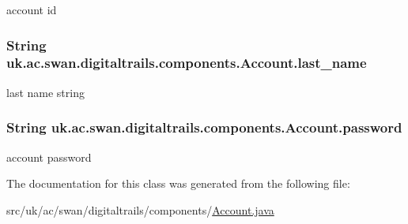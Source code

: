 account id 

\hypertarget{classuk_1_1ac_1_1swan_1_1digitaltrails_1_1components_1_1_account_a30eb77af35d518d869fb6cae590151e0}{
\subsubsection[{last\+\_\+name}]{\setlength{\rightskip}{0pt plus 5cm}String uk.\+ac.\+swan.\+digitaltrails.\+components.\+Account.\+last\+\_\+name}}\label{classuk_1_1ac_1_1swan_1_1digitaltrails_1_1components_1_1_account_a30eb77af35d518d869fb6cae590151e0}


last name string 

\hypertarget{classuk_1_1ac_1_1swan_1_1digitaltrails_1_1components_1_1_account_a7a421a5b7ed69b2841fc0054e807f01f}{
\subsubsection[{password}]{\setlength{\rightskip}{0pt plus 5cm}String uk.\+ac.\+swan.\+digitaltrails.\+components.\+Account.\+password}}\label{classuk_1_1ac_1_1swan_1_1digitaltrails_1_1components_1_1_account_a7a421a5b7ed69b2841fc0054e807f01f}


account password 



The documentation for this class was generated from the following file\+:\begin{DoxyCompactItemize}
\item 
src/uk/ac/swan/digitaltrails/components/\hyperlink{_account_8java}{Account.\+java}\end{DoxyCompactItemize}
